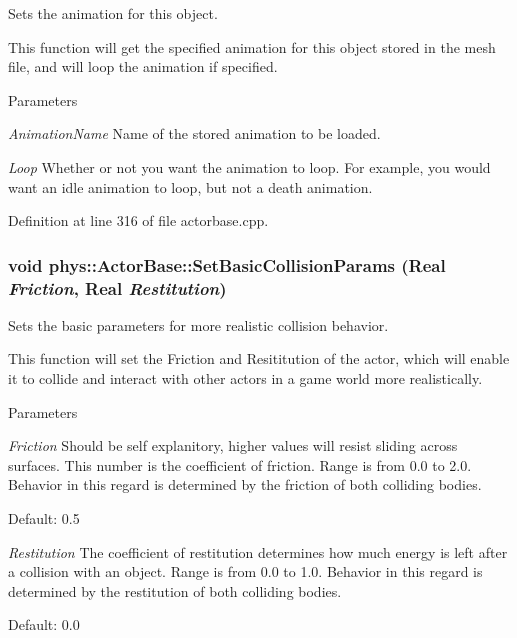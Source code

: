 Sets the animation for this object. 

This function will get the specified animation for this object stored in the mesh file, and will loop the animation if specified. 
\begin{DoxyParams}{Parameters}
\item[{\em AnimationName}]Name of the stored animation to be loaded. \item[{\em Loop}]Whether or not you want the animation to loop. For example, you would want an idle animation to loop, but not a death animation. \end{DoxyParams}


Definition at line 316 of file actorbase.cpp.

\hypertarget{classphys_1_1ActorBase_ac60e1ebd1a08882234a6d04aff745260}{
\subsubsection[{SetBasicCollisionParams}]{\setlength{\rightskip}{0pt plus 5cm}void phys::ActorBase::SetBasicCollisionParams ({\bf Real} {\em Friction}, \/  {\bf Real} {\em Restitution})}}
\label{d8/d0f/classphys_1_1ActorBase_ac60e1ebd1a08882234a6d04aff745260}


Sets the basic parameters for more realistic collision behavior. 

This function will set the Friction and Resititution of the actor, which will enable it to collide and interact with other actors in a game world more realistically. 
\begin{DoxyParams}{Parameters}
\item[{\em Friction}]Should be self explanitory, higher values will resist sliding across surfaces. This number is the coefficient of friction. Range is from 0.0 to 2.0. Behavior in this regard is determined by the friction of both colliding bodies. \par
 Default: 0.5 \item[{\em Restitution}]The coefficient of restitution determines how much energy is left after a collision with an object. Range is from 0.0 to 1.0. Behavior in this regard is determined by the restitution of both colliding bodies. \par
 Default: 0.0 \end{DoxyParams}


